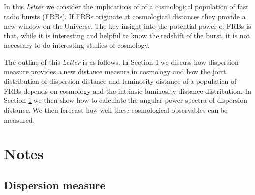 \documentclass[twocolumn,prd,noshowpacs,nofootinbib,amsmath,amssymb]{revtex4}
\begin{document}
In this \emph{ Letter} we consider the implications of of a cosmological population of fast radio bursts (FRBs). 
 If FRBs originate at cosmological distances they provide a new window on the Universe. The key insight into the potential power of FRBs is that, while it is interesting and helpful to know the redshift of the burst, it is not necessary to do interesting studies of cosmology.
 
 The outline of this \emph{Letter} is as follows. In Section \ref{sec:notes} we discuss how dispersion measure provides a new distance measure in cosmology and how the joint distribution of dispersion-distance and luminosity-distance of a population of FRBs depends on cosmology and the intrinsic luminosity distance distribution.   In Section \ref{sec:notes} we then show how to calculate the angular power spectra of dispersion distance.  We then forecast how well these cosmological observables can be measured.

%
%

\section{Notes}\label{sec:notes}

\subsection{Dispersion measure}


\end{document}

